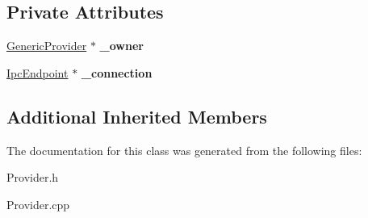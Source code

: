 \subsection*{Private Attributes}
\begin{DoxyCompactItemize}
\item 
\mbox{\label{class_generic_provider_1_1_connection_a277c17f0e1003a10867f5ceab3774acf}} 
\hyperlink{class_generic_provider}{Generic\+Provider} $\ast$ {\bfseries \+\_\+owner}
\item 
\mbox{\label{class_generic_provider_1_1_connection_a46d806055858dce259f81d6a9d425a22}} 
\hyperlink{class_ipc_endpoint}{Ipc\+Endpoint} $\ast$ {\bfseries \+\_\+connection}
\end{DoxyCompactItemize}
\subsection*{Additional Inherited Members}


The documentation for this class was generated from the following files\+:\begin{DoxyCompactItemize}
\item 
Provider.\+h\item 
Provider.\+cpp\end{DoxyCompactItemize}
